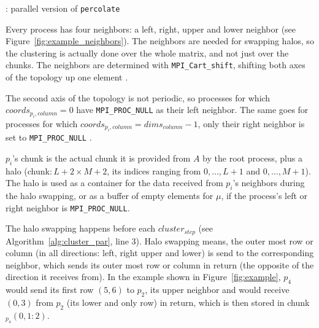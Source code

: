 \documentclass[twoside,11pt]{article}
\def\perc{\texttt{perco\-late}}
\begin{document}
\begin{algorithm} %
  \caption{: parallel version of \perc{}}
  \label{alg:perc_par}

  \begin{algorithmic}[1]
    \ENDIF
    \ENDIF

  \end{algorithmic}
\end{algorithm} %

Every process has four neighbors: a left, right, upper and
lower neighbor (see Figure~\ref{fig:example_neighbors}).
The neighbors are needed for swapping halos, so the
clustering is actually done over the whole matrix, and not
just over the chunks.
The neighbors are determined with
\texttt{MPI\_Cart\_shift}, shifting both axes of the
topology up one element \citep[see][Chapter 7]{mpi}.

The second axis of the topology is not periodic, so
processes for which $coords_{p_i, column} = 0$ have
\texttt{MPI\_PROC\_NULL} as their left neighbor.
The same goes for processes for which
$coords_{p_i, column} = dims_{column} - 1$, only their
right neighbor is set to \texttt{MPI\_PROC\_NULL}
\citep[see Figure~\ref{fig:example_neighbors} and]
[Chapter 3]{mpi}.

$p_i$'s chunk is the actual chunk it is provided from $A$
by the root process, plus a halo (chunk$: L+2 \times M+2$,
its indices ranging from $0,\dots,L+1$ and $0,\dots,M+1$).
The halo is used as a container for the data received from
$p_i$'s neighbors during the halo swapping, or as a buffer
of empty elements for $\mu$, if the process's left or right
neighbor is \texttt{MPI\_PROC\_NULL}.

The halo swapping happens before each $cluster_{step}$
(see Algorithm~\ref{alg:cluster_par}, line 3).
Halo swapping means, the outer most row or column (in
all directions: left, right upper and lower) is send
to the corresponding neighbor, which sends its outer most
row or column in return (the opposite of the direction it
receives from).
In the example shown in Figure~\ref{fig:example}, $p_4$
would send its first row $(5,6)$ to $p_2$, its upper
neighbor and would receive $(0,3)$ from $p_2$ (its lower
and only row) in return, which is then stored in
chunk$_{p_4}(0, 1:2)$.
\end{document}
